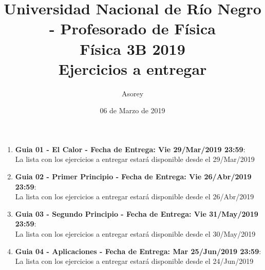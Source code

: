 \documentclass[a4paper,12pt]{article}
\begin{document}
\title{
{\normalsize{Universidad Nacional de Río Negro - Profesorado de Física}}\\
Física 3B 2019\\ Ejercicios a entregar}
\author{Asorey}
\date{06 de Marzo de 2019}
\maketitle

\begin{enumerate}
	\item {\bf{Guia 01 - El Calor - Fecha de Entrega: Vie 29/Mar/2019 23:59}}:\\
		La lista con los ejercicios a entregar estará disponible desde el 29/Mar/2019
	\item {\bf{Guia 02 - Primer Principio - Fecha de Entrega: Vie 26/Abr/2019 23:59}}:\\		
		La lista con los ejercicios a entregar estará disponible desde el 26/Abr/2019
	\item {\bf{Guia 03 - Segundo Principio - Fecha de Entrega: Vie 31/May/2019 23:59}}:\\		
		La lista con los ejercicios a entregar estará disponible desde el 30/May/2019
	\item {\bf{Guia 04 - Aplicaciones - Fecha de Entrega: Mar 25/Jun/2019 23:59}}:\\		
		La lista con los ejercicios a entregar estará disponible desde el 24/Jun/2019
\end{enumerate}
\end{document}
